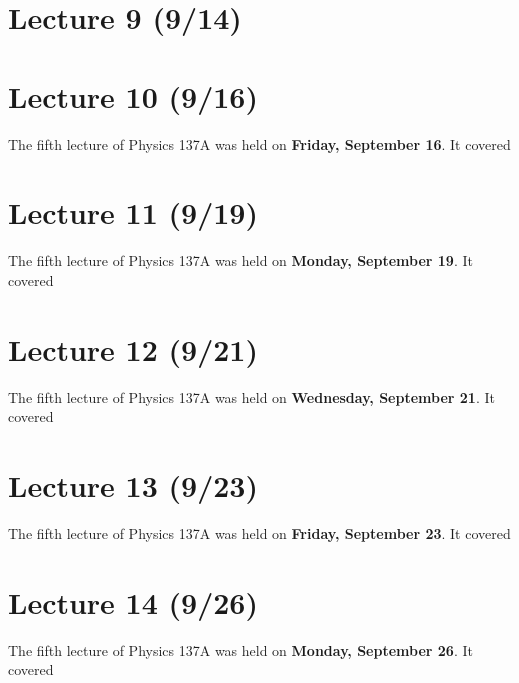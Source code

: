 \documentclass{book}
\theoremstyle{plain}
\begin{document}
      \chapter{Lecture 9 (9/14)}
        
        
      \chapter{Lecture 10 (9/16)}
        The fifth lecture of Physics 137A was held on \textbf{Friday, September 16}. It covered
        
      \chapter{Lecture 11 (9/19)}
        The fifth lecture of Physics 137A was held on \textbf{Monday, September 19}. It covered
        
      \chapter{Lecture 12 (9/21)}
        The fifth lecture of Physics 137A was held on \textbf{Wednesday, September 21}. It covered
        
      \chapter{Lecture 13 (9/23)}
        The fifth lecture of Physics 137A was held on \textbf{Friday, September 23}. It covered
        
      \chapter{Lecture 14 (9/26)}
        The fifth lecture of Physics 137A was held on \textbf{Monday, September 26}. It covered
        
\end{document}
